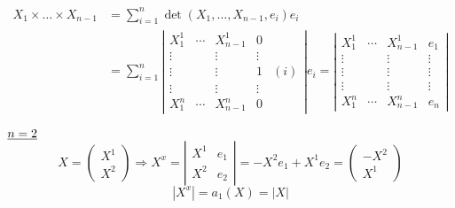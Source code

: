 \begin{align*}
 X_1 \times \dots \times X_{n-1} &= \sum_{i=1}^n \det (X_1, \dots, X_{n-1},e_i)e_i \\
				 &= \sum_{i=1}^n \left\vert\begin{matrix}
                                                            X_1^1  &\cdots  &X_{n-1}^1 &0 &\\
                                                            \vdots &       & \vdots   &\vdots &\\
                                                            \vdots &       & \vdots   &1 &(i)\\
                                                            \vdots &       & \vdots   & \vdots &\\
                                                            X_1^n  & \cdots &X_{n-1}^n &0 &
                                                           \end{matrix}
                                                           \right\vert  e_i = \left\vert\begin{matrix}
										         X_1^1 & \cdots & X_{n-1}^1 & e_1 \\
                                                                                         \vdots & & \vdots & \vdots \\
                                                                                         \vdots & & \vdots & \vdots \\
                                                                                         \vdots & & \vdots & \vdots \\
                                                                                         X_1^n & \cdots & X_{n-1}^n & e_n
                                                                                        \end{matrix}
                                                                                        \right\vert
\end{align*}
\begin{bsp}{\(\uline{n=2}\)}
 \[ X=\begin{pmatrix}
       X^1 \\
       X^2
      \end{pmatrix}
      \Rightarrow X^x = \left\vert \begin{matrix}
                                    X^1 & e_1 \\
                                    X^2 & e_2
                                   \end{matrix}
			\right\vert
			= -X^2 e_1 + X^1 e_2 = \begin{pmatrix}
			                        -X^2 \\
			                        X^1
			                       \end{pmatrix}
\]
\[
 |X^x| = a_1(X) = |X|
\]
\end{bsp}


